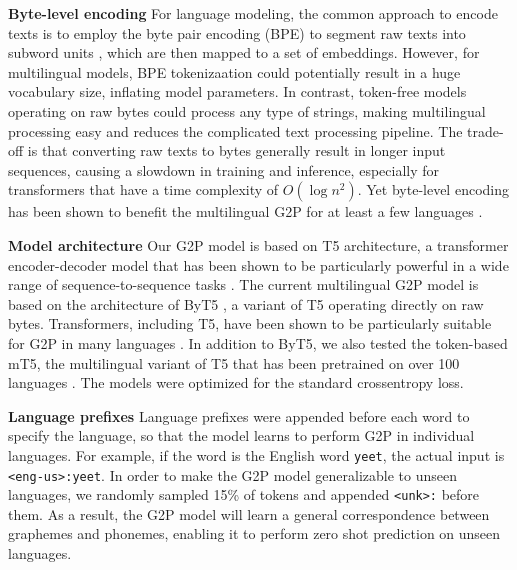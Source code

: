 \documentclass[a4paper]{article}
\begin{document}
\textbf{Byte-level encoding}  For language modeling, the common approach to encode texts is to employ the byte pair encoding (BPE) to segment raw texts into subword units \cite{sennrich-etal-2016-neural}, which are then mapped to a set of embeddings. However, for multilingual models, BPE tokenizaation could potentially result in a huge vocabulary size, inflating model parameters. In contrast, token-free models \cite{xue2021byt5} operating on raw bytes could process any type of strings, making multilingual processing easy and reduces the complicated text processing pipeline. The trade-off is that converting raw texts to bytes generally result in longer input sequences, causing a slowdown in training and inference, especially for transformers that have a time complexity of $O(\log n^2)$. Yet byte-level encoding has been shown to benefit the multilingual G2P for at least a few languages \cite{yu2020multilingual}.


\textbf{Model architecture} Our G2P model is based on T5 architecture, a transformer encoder-decoder model that has been shown to be particularly powerful in a wide range of sequence-to-sequence tasks \cite{raffel2020exploring}. The current multilingual G2P model is based on the architecture of ByT5 \cite{xue2021byt5}, a variant of T5 operating directly on raw bytes. Transformers, including T5, have been shown to be particularly suitable for G2P in many languages \cite{yu2020multilingual,vesik-etal-2020-one,rezackova21_interspeech}. In addition to ByT5, we also tested the token-based mT5, the multilingual variant of T5 that has been pretrained on over 100 languages \cite{xue2021mt5}. The models were optimized for the standard crossentropy loss. 



\textbf{Language prefixes} Language prefixes were appended before each word to specify the language, so that the model learns to perform G2P in individual languages. For example, if the word is the English word \texttt{yeet}, the actual input is \texttt{<eng-us>:yeet}.  In order to make the G2P model generalizable to unseen languages, we randomly sampled 15\% of tokens and appended \texttt{<unk>:} before them. As a result, the G2P model will learn a general correspondence between graphemes and phonemes, enabling it to perform zero shot prediction on unseen languages.
\end{document}
